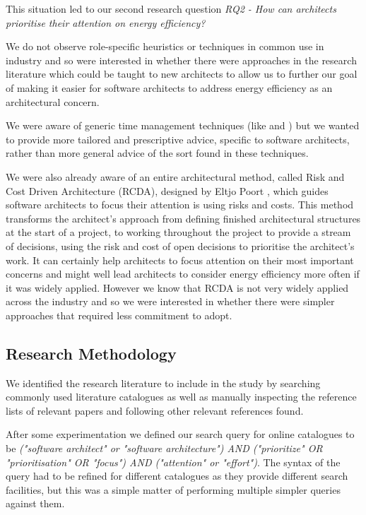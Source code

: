 This situation led to our second research question \emph{RQ2 - How can architects prioritise their attention on energy efficiency?}

We do not observe role-specific heuristics or techniques in common use in industry and so were interested in whether there were approaches in the research literature which could be taught to new architects to allow us to further our goal of making it easier for software architects to address energy efficiency as an architectural concern.  

We were aware of generic time management techniques (like \cite{allen2015-gettingthingsdone} and \cite{koch1998-8020principle}) but we wanted to provide more tailored and prescriptive advice, specific to software architects, rather than more general advice of the sort found in these techniques.

We were also already aware of an entire architectural method, called Risk and Cost Driven Architecture (RCDA), designed by Eltjo Poort \cite{poort2012-rcda}, which guides software architects to focus their attention is using risks and costs.  This method transforms the architect's approach from defining finished architectural structures at the start of a project, to working throughout the project to provide a stream of decisions, using the risk and cost of open decisions to prioritise the architect's work. It can certainly help architects to focus attention on their most important concerns and might well lead architects to consider energy efficiency more often if it was widely applied.  However we know that RCDA is not very widely applied across the industry and so we were interested in whether there were simpler approaches that required less commitment to adopt.

\subsection{Research Methodology}

We identified the research literature to include in the study by searching commonly used literature catalogues as well as manually inspecting the reference lists of relevant papers and following other relevant references found.

After some experimentation we defined our search query for online catalogues to be \emph{("software architect" or "software architecture") AND ("prioritize" OR "prioritisation" OR "focus") AND ("attention" or "effort")}.  The syntax of the query had to be refined for different catalogues as they provide different search facilities, but this was a simple matter of performing multiple simpler queries against them.

